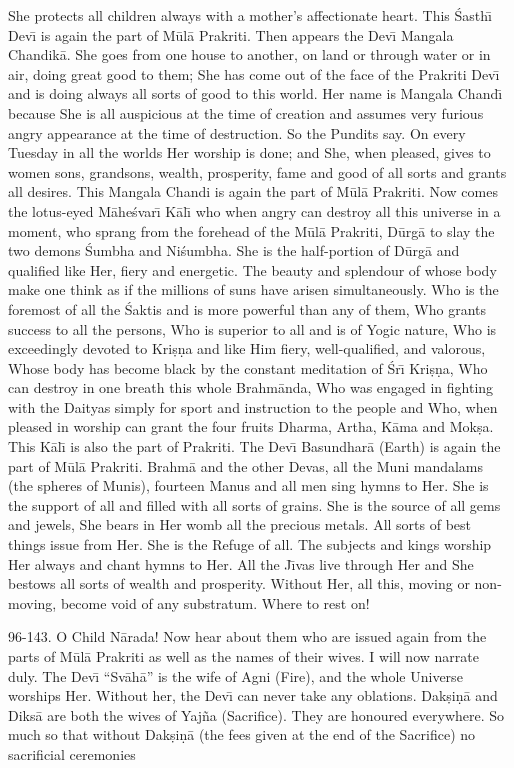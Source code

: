 She protects all children always with a mother's affectionate heart. This \'Sasth\={\i} Dev\={\i} is again the part of M\=ul\=a Prakriti. Then appears the Dev\={\i} Mangala Chandik\=a. She goes from one house to another, on land or through water or in air, doing great good to them; She has come out of the face of the Prakriti Dev\={\i} and is doing always all sorts of good to this world. Her name is Mangala Chand\={\i} because She is all auspicious at the time of creation and assumes very furious angry appearance at the time of destruction. So the Pundits say. On every Tuesday in all the worlds Her worship is done; and She, when pleased, gives to women sons, grandsons, wealth, prosperity, fame and good of all sorts and grants all desires. This Mangala Chandi is again the part of M\=ul\=a Prakriti. Now comes the lotus-eyed M\=ahe\'svar\={\i} K\=al\={\i} who when angry can destroy all this universe in a moment, who sprang from the forehead of the M\=ul\=a Prakriti, D\=urg\=a to slay the two demons \'Sumbha and Ni\'sumbha. She is the half-portion of D\=urg\=a and qualified like Her, fiery and energetic. The beauty and splendour of whose body make one think as if the millions of suns have arisen simultaneously. Who is the foremost of all the \'Saktis and is more powerful than any of them, Who grants success to all the persons, Who is superior to all and is of Yogic nature, Who is exceedingly devoted to Kri\d{s}\d{n}a and like Him fiery, well-qualified, and valorous, Whose body has become black by the constant meditation of \'Sr\={\i} Kri\d{s}\d{n}a, Who can destroy in one breath this whole Brahm\=anda, Who was engaged in fighting with the Daityas simply for sport and instruction to the people and Who, when pleased in worship can grant the four fruits Dharma, Artha, K\=ama and Mok\d{s}a. This K\=al\={\i} is also the part of Prakriti. The Dev\={\i} Basundhar\=a (Earth) is again the part of M\=ul\=a Prakriti. Brahm\=a and the other Devas, all the Muni mandalams (the spheres of Munis), fourteen Manus and all men sing hymns to Her. She is the support of all and filled with all sorts of grains. She is the source of all gems and jewels, She bears in Her womb all the precious metals. All sorts of best things issue from Her. She is the Refuge of all. The subjects and kings worship Her always and chant hymns to Her. All the J\={\i}vas live through Her and She bestows all sorts of wealth and prosperity. Without Her, all this, moving or non-moving, become void of any substratum. Where to rest on!

96-143. O Child N\=arada! Now hear about them who are issued again from the parts of M\=ul\=a Prakriti as well as the names of their wives. I will now narrate duly. The Dev\={\i} ``Sv\=ah\=a'' is the wife of Agni (Fire), and the whole Universe worships Her. Without her, the Dev\={\i} can never take any oblations. Dak\d{s}i\d{n}\=a and Diks\=a are both the wives of Yaj\~na (Sacrifice). They are honoured everywhere. So much so that without Dak\d{s}i\d{n}\=a (the fees given at the end of the Sacrifice) no sacrificial ceremonies

